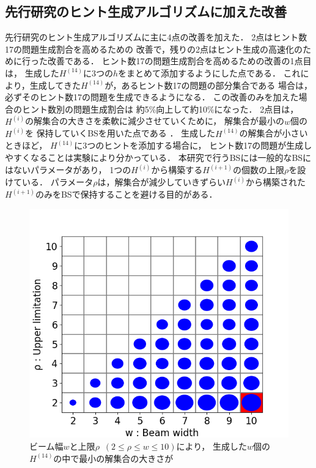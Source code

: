 \documentclass[a4paper, 9pt]{jarticle}
\begin{document}
\begin{論文概要}
\section{先行研究のヒント生成アルゴリズムに加えた改善}
先行研究のヒント生成アルゴリズムに主に4点の改善を加えた．
2点はヒント数17の問題生成割合を高めるための
改善で，残りの2点はヒント生成の高速化のために行った改善である．
ヒント数17の問題生成割合を高めるための改善の1点目は，
生成した$H^{(14)}$に3つの$h$をまとめて添加するようにした点である．
これにより，生成してきた$H^{(14)}$が，あるヒント数17の問題の部分集合である
場合は，必ずそのヒント数17の問題を生成できるようになる．
この改善のみを加えた場合のヒント数別の問題生成割合は
約5\%向上して約10\%になった．
2点目は，$H^{(i)}$の解集合の大きさを柔軟に減少させていくために，
解集合が最小の$w$個の$H^{(i)}$を
保持していくBSを用いた点である \cite{nagao}．
生成した$H^{(14)}$の解集合が小さいときほど，
$H^{(14)}$に3つのヒントを添加する場合に，
ヒント数17の問題が生成しやすくなることは実験により分かっている．
本研究で行うBSには一般的なBSにはないパラメータがあり，
1つの$H^{(i)}$から構築する$H^{(i+1)}$の個数の上限$\rho$を設けている．
パラメータ$\rho$は，解集合が減少していきずらい$H^{(i)}$から構築された
$H^{(i+1)}$のみをBSで保持することを避ける目的がある．
\begin{figure}[bt]
  \centering
  \includegraphics[keepaspectratio, scale=0.4]{best_beam_width_and_rho.png}
  \caption{ビーム幅$w$と上限$\rho$~$(2 \leq \rho \leq w \leq 10)$により，
  生成した$w$個の$H^{(14)}$の中で最小の解集合の大きさが
}
\end{figure}
\end{論文概要}
\end{document}
